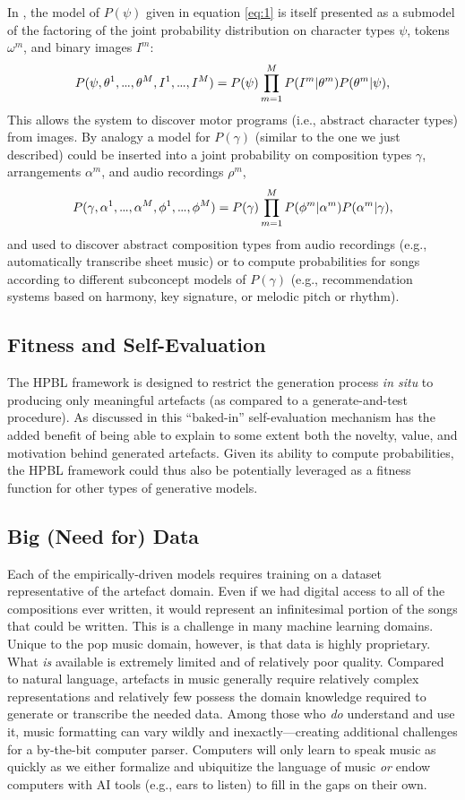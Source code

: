 \documentclass[letterpaper]{article}
\newcommand\mydots{\hbox to .75em{.\hss.\hss.}}
\begin{document}
In \cite{lake2015human}, the model of $P(\psi)$ given in equation \ref{eq:1} is itself presented as a submodel of the factoring of the joint probability distribution on character types $\psi$, tokens $\omega^m$, and binary images $I^m$:
\[ P(\psi, \theta^1, \mydots,\theta^M,I^1,\mydots,I^M) = P(\psi) \prod_{m=1}^{M} P(I^m|\theta^m)P(\theta^m|\psi), \]
This allows the system to discover motor programs (i.e., abstract character types) from images. By analogy a model for $P(\gamma)$ (similar to the one we just described) could be inserted into a joint probability on composition types $\gamma$, arrangements $\alpha^m$, and audio recordings $\rho^m$,
\[ P(\gamma,\alpha^1,\mydots,\alpha^M,\phi^1,\mydots, \phi^M) = P(\gamma) \prod_{m=1}^M P(\phi^m|\alpha^m)P(\alpha^m|\gamma), \]
\noindent and used to discover abstract composition types from audio recordings (e.g., automatically transcribe sheet music) or to compute probabilities for songs according to different subconcept models of $P(\gamma)$ (e.g., recommendation systems based on harmony, key signature, or melodic pitch or rhythm).

\subsection{Fitness and Self-Evaluation}

The HPBL framework is designed to restrict the generation process \emph{in situ} to producing only meaningful artefacts (as compared to a generate-and-test procedure). As discussed in \cite{ventura2016mere} this ``baked-in'' self-evaluation mechanism has the added benefit of being able to explain to some extent both the novelty, value, and motivation behind generated artefacts. Given its ability to compute probabilities, the HPBL framework could thus also be potentially leveraged as a fitness function for other types of generative models.

\subsection{Big (Need for) Data}

Each of the empirically-driven models requires training on a dataset representative of the artefact domain. Even if we had digital access to all of the compositions ever written, it would represent an infinitesimal portion of the songs that could be written. This is a challenge in many machine learning domains. Unique to the pop music domain, however, is that data is highly proprietary. What \textit{is} available is extremely limited and of relatively poor quality. Compared to natural language, artefacts in music generally require relatively complex representations and relatively few possess the domain knowledge required to generate or transcribe the needed data. Among those who \textit{do} understand and use it, music formatting can vary wildly and inexactly---creating additional challenges for a by-the-bit computer parser. Computers will only learn to speak music as quickly as we either formalize and ubiquitize the language of music \textit{or} endow computers with AI tools (e.g., ears to listen) to fill in the gaps on their own.
\end{document}
